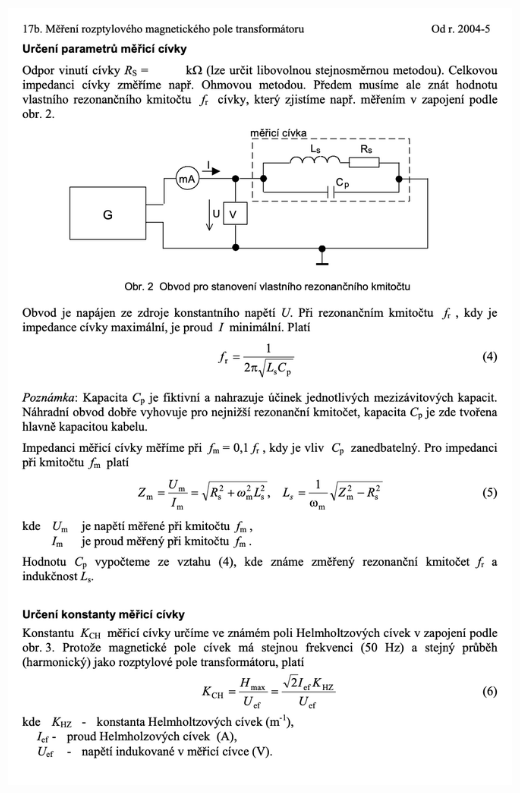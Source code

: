 \documentclass[a4paper,12pt]{article}   %
\begin{document}
\includegraphics[width=\textwidth]{4.png}
\newpage
\end{document}

